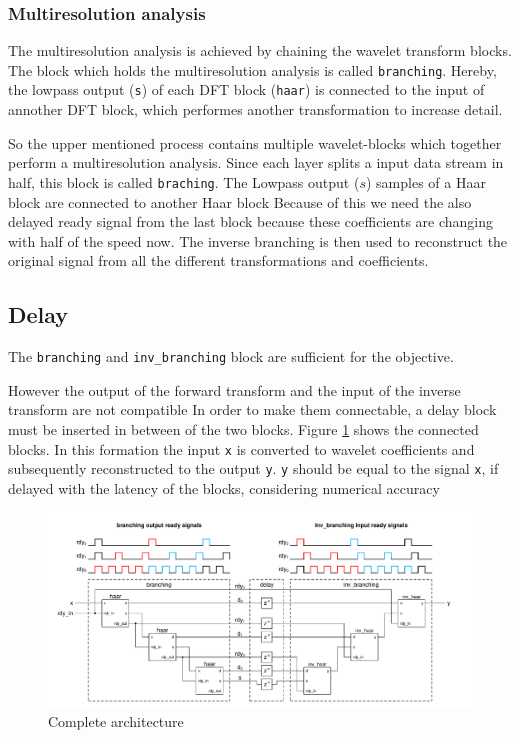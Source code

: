 \begin{refsection}



\subsubsection{Multiresolution analysis}

The multiresolution analysis is achieved by chaining the wavelet transform blocks.
The block which holds the multiresolution analysis is called \texttt{branching}.
Hereby, the lowpass output (\texttt{s}) of each DFT block (\texttt{haar}) is connected to the input of annother DFT block, which performes another transformation to increase detail. 


So the upper mentioned process contains multiple wavelet-blocks which together perform a multiresolution analysis.
Since each layer splits a input data stream in half, this block is called \texttt{braching}.
The Lowpass output ($s$) samples of a Haar block are connected to another Haar block 
Because of this we need the also delayed ready signal from the last block because these coefficients are changing with half of the speed now. 
The inverse branching is then used to reconstruct the original signal from all the different transformations and coefficients.


\subsection{Delay}

The \texttt{branching} and \texttt{inv\_branching} block are sufficient for the objective. %

However the output of the forward transform and the input of the inverse transform are not compatible
In order to make them connectable, a delay block must be inserted in between of the two blocks.
Figure \ref{fpga:fig:mainDelay} shows the connected blocks.
In this formation the input \texttt{x} is converted to wavelet coefficients and subsequently reconstructed to the output \texttt{y}.
\texttt{y} should be equal to the signal \texttt{x}, if delayed with the latency of the blocks, considering numerical accuracy
\begin{figure}
	\centering
	\includegraphics[width=\textwidth]{papers/fpga/images/main_delay.pdf}
	\caption{Complete architecture \label{fpga:fig:mainDelay}}
\end{figure}



\end{refsection}
